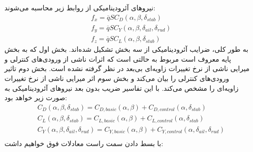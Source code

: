نیروهای آئرودینامیکی از روابط زیر محاسبه می‌شوند:
\begin{equation}\label{eq:Faero}
\begin{split}
&f_x= \overline{q}SC_{D}(\alpha,\beta,\delta_{stab})\\
&f_y= \overline{q}SC_{Y}(\alpha,\beta,\delta_{ail},\delta_{rud})\\
&f_z= \overline{q}SC_{L}(\alpha,\beta,\delta_{stab})
\end{split}
\end{equation} 
به طور کلی، ضرایب آئرودینامیکی از سه بخش تشکیل شده‌اند. 
بخش اول که به بخش پایه معروف است مربوط به حالتی است که اثرات ناشی از ورودی‌های کنترلی و میرایی ناشی از نرخ تغییرات زاویه‌ای بی‌بعد در نظر گرفته نشده است. 
بخش دوم تاثیر ورودی‌های کنترلی را بیان می‌کند و بخش سوم اثر میرایی ناشی از نرخ تغییرات زاویه‌ای را مشخص می‌کند. 
با این تفاسیر ضریب بدون بعد نیروهای آئرودینامیکی به صورت زیر خواهد بود:
\begin{equation}
\begin{split}
&C_{D}(\alpha,\beta,\delta_{stab})=C_{D,basic}(\alpha,\beta)+C_{D,control}(\alpha,\delta_{stab})\\
&C_{L}(\alpha,\beta,\delta_{stab})=C_{L,basic}(\alpha,\beta)+C_{L,control}(\alpha,\delta_{stab})\\
&C_{Y}(\alpha,\beta,\delta_{ail},\delta_{rud})=C_{Y,basic}(\alpha,\beta)+C_{Y,control}(\alpha,\delta_{ail},\delta_{rud})\\
\end{split}
\end{equation}
با بسط دادن سمت راست معادلات فوق خواهیم داشت:
